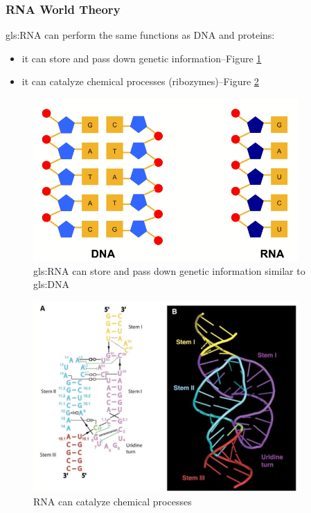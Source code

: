 \documentclass[]{article}
\begin{document}
\subsubsection{RNA World Theory}
\gls{gls:RNA} can perform the same functions as DNA and proteins:
\begin{itemize}
	\item   it can store and pass down genetic information--Figure \ref{fig:RNA_WorldTheory}
	\item it  can catalyze chemical processes (ribozymes)--Figure \ref{fig:RNA_can_catalyze_chemical_processes}\cite{scott2013hammerhead}
\end{itemize}
\begin{figure}[H]
	\caption[RNA can store and pass down genetic information similar to DNA]{\gls{gls:RNA}  can store and pass down genetic information similar to \gls{gls:DNA} }\label{fig:RNA_WorldTheory}
	\includegraphics[width=0.9\textwidth]{RNA_WorldTheory}
\end{figure}

\begin{figure}[H]
	\caption{RNA can catalyze chemical processes}\label{fig:RNA_can_catalyze_chemical_processes}
	\includegraphics[width=0.9\textwidth]{RNA_can_catalyze_chemical_processes}
\end{figure}
\end{document}
